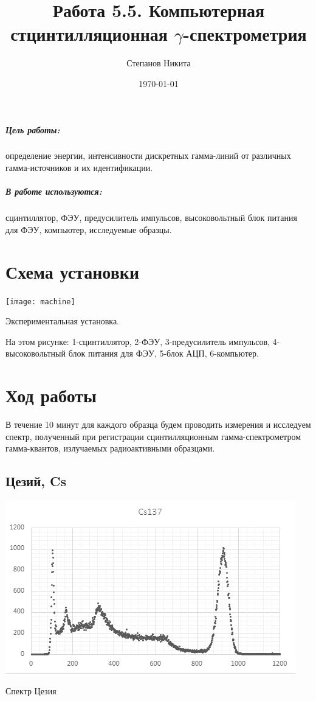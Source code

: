 \documentclass[a4paper,12pt]{article} %
\author{Степанов Никита}
\title{Работа 5.5. Компьютерная стцинтилляционная $\gamma$-спектрометрия}
\date{\today}
\begin{document}

\maketitle \newpage

{\small \subparagraph{{\small Цель работы:}}
определение энергии, интенсивности дискретных гамма-линий от различных гамма-источников и их идентификации.
}

{\small \subparagraph{{\small В работе используются:}}
сцинтиллятор, ФЭУ, предусилитель импульсов, высоковольтный блок питания для ФЭУ, компьютер, исследуемые образцы.
}

\section*{Схема установки}
\begin{center}
\texttt{[image: machine]}

Экспериментальная установка.
\end{center}
На этом рисунке: 1-сцинтиллятор, 2-ФЭУ, 3-предусилитель импульсов, 4-высоковольтный блок питания для ФЭУ, 5-блок АЦП, 6-компьютер.

\section*{Ход работы}
В течение 10 минут для каждого образца будем проводить измерения и исследуем спектр, полученный при регистрации сцинтилляционным гамма-спектрометром гамма-квантов, излучаемых радиоактивными образцами.

\subsection*{Цезий, Cs}
\begin{center}
\includegraphics[scale=0.4]{Cs}

Спектр Цезия
\end{center}
\end{document}
